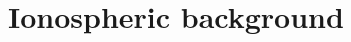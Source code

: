 \documentclass[times,twocolumn,final,authoryear]{elsarticle}
\begin{document}



\section{Ionospheric background}
\end{document}
